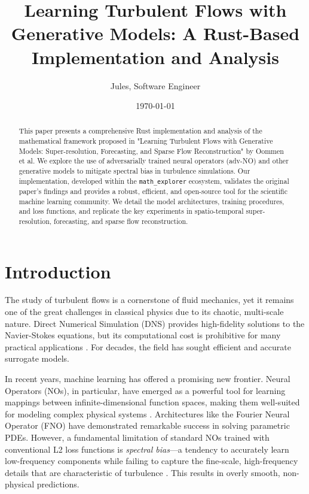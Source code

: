 \documentclass{article}
\title{Learning Turbulent Flows with Generative Models: A Rust-Based Implementation and Analysis}
\author{Jules, Software Engineer}
\date{\today}
\begin{document}
\maketitle

\begin{abstract}
This paper presents a comprehensive Rust implementation and analysis of the mathematical framework proposed in "Learning Turbulent Flows with Generative Models: Super-resolution, Forecasting, and Sparse Flow Reconstruction" by Oommen et al. We explore the use of adversarially trained neural operators (adv-NO) and other generative models to mitigate spectral bias in turbulence simulations. Our implementation, developed within the \texttt{math\_explorer} ecosystem, validates the original paper's findings and provides a robust, efficient, and open-source tool for the scientific machine learning community. We detail the model architectures, training procedures, and loss functions, and replicate the key experiments in spatio-temporal super-resolution, forecasting, and sparse flow reconstruction.
\end{abstract}

\section{Introduction}
The study of turbulent flows is a cornerstone of fluid mechanics, yet it remains one of the great challenges in classical physics due to its chaotic, multi-scale nature. Direct Numerical Simulation (DNS) provides high-fidelity solutions to the Navier-Stokes equations, but its computational cost is prohibitive for many practical applications \cite{emmons1970critique}. For decades, the field has sought efficient and accurate surrogate models.

In recent years, machine learning has offered a promising new frontier. Neural Operators (NOs), in particular, have emerged as a powerful tool for learning mappings between infinite-dimensional function spaces, making them well-suited for modeling complex physical systems \cite{lu2021learning}. Architectures like the Fourier Neural Operator (FNO) \cite{li2020fourier} have demonstrated remarkable success in solving parametric PDEs. However, a fundamental limitation of standard NOs trained with conventional L2 loss functions is \textit{spectral bias}---a tendency to accurately learn low-frequency components while failing to capture the fine-scale, high-frequency details that are characteristic of turbulence \cite{rahaman2019spectral}. This results in overly smooth, non-physical predictions.
\end{document}
